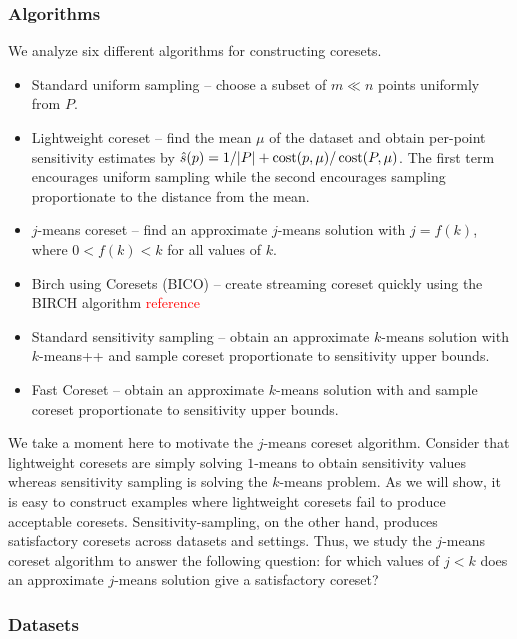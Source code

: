 
\subsubsection{Algorithms}

We analyze six different algorithms for constructing coresets.
\begin{itemize}
        \item Standard uniform sampling -- choose a subset of $m \ll n$ points uniformly from $P$.
        \item Lightweight coreset -- find the mean $\mu$ of the dataset and obtain per-point sensitivity estimates by $\hat{s}(p) = 1/|P| + \operatorname{cost}(p, \mu) / \operatorname{cost}(P, \mu)$.
            The first term encourages uniform sampling while the second encourages sampling proportionate to the distance from the mean.
        \item $j$-means coreset -- find an approximate $j$-means solution with $j = f(k)$, where $0 < f(k) < k$ for all values of $k$.
        \item Birch using Coresets (BICO) -- create streaming coreset quickly using the BIRCH algorithm \textcolor{red}{reference}
        \item Standard sensitivity sampling -- obtain an approximate $k$-means solution with $k$-means++ and sample coreset proportionate to sensitivity upper bounds.
        \item Fast Coreset -- obtain an approximate $k$-means solution with \fkmeans and sample coreset proportionate to sensitivity upper bounds.

\end{itemize}

We take a moment here to motivate the $j$-means coreset algorithm.  Consider that lightweight coresets are simply solving $1$-means to obtain sensitivity values
whereas sensitivity sampling is solving the $k$-means problem.  As we will show, it is easy to construct examples where lightweight coresets fail to produce
acceptable coresets. Sensitivity-sampling, on the other hand, produces satisfactory coresets across datasets and settings. Thus, we study the $j$-means coreset
algorithm to answer the following question: for which values of $j < k$ does an approximate $j$-means solution give a satisfactory coreset?

\subsubsection{Datasets}

